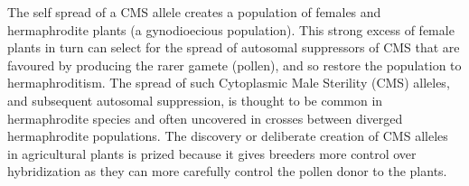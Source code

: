 {The self spread of a CMS allele creates a population
of females and hermaphrodite plants (a gynodioecious population).
This strong excess of female plants in
turn can select for the spread of autosomal suppressors of CMS that are
favoured by producing the rarer gamete (pollen), and so restore the
population to hermaphroditism.  The spread of such Cytoplasmic Male
Sterility (CMS) alleles, and subsequent autosomal suppression, is thought to be common in hermaphrodite
species and often uncovered in crosses between diverged hermaphrodite populations.
The discovery or deliberate creation of CMS alleles in agricultural plants is
prized because it gives breeders more control over hybridization as
they can more carefully control the pollen donor to the plants.

}

